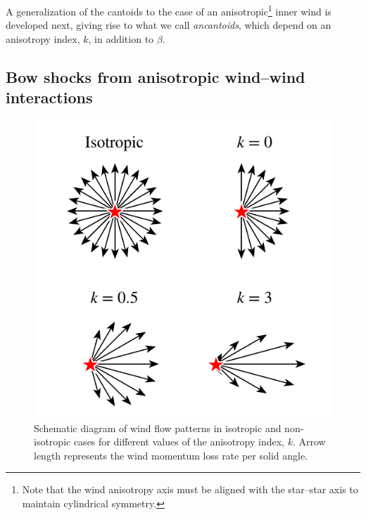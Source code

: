 A generalization of the cantoids to the case of an
anisotropic\footnote{Note that the wind anisotropy axis must be
  aligned with the star--star axis to maintain cylindrical symmetry.}
inner wind is developed next, giving rise
to what we call \textit{ancantoids}, which depend on an anisotropy
index, \(k\), in addition to \(\beta\).  

\subsection{Bow shocks from anisotropic wind--wind interactions}
\label{sec:ancantoid}
\begin{figure}
  \centering
  \includegraphics[width=\linewidth]{figs/anisotropic-arrows}
  \caption[]{Schematic diagram of wind flow patterns in isotropic and
    non-isotropic cases for different values of the anisotropy index,
    \(k\).  Arrow length represents the wind momentum loss rate per
    solid angle.}
  \label{fig:anisotropic-arrows}
\end{figure}


